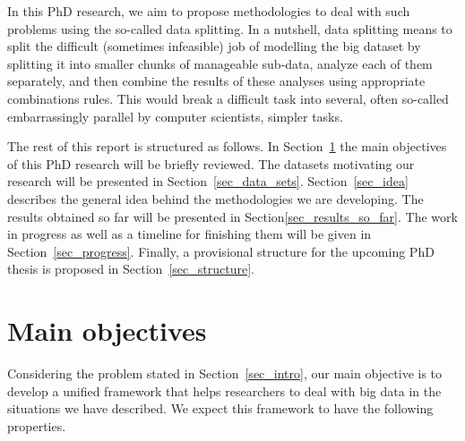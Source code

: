 \documentclass[14pt]{article}
\begin{document}
In this PhD research, we aim to propose methodologies to deal with such problems using the so-called data splitting. In a nutshell, data splitting means to split the difficult (sometimes infeasible) job of modelling the big dataset by splitting it into smaller chunks of manageable sub-data, analyze each of them separately, and then combine the results of these analyses using appropriate combinations rules. This would break a difficult task into several, often so-called embarrassingly parallel by computer scientists, simpler tasks.

The rest of this report is structured as follows. In Section~\ref{sec_objective} the main objectives of this PhD research will be briefly reviewed. The datasets motivating our research will be presented in Section~\ref{sec_data_sets}. Section~\ref{sec_idea} describes the general idea behind the methodologies we are developing. The results obtained so far will be presented in Section\ref{sec_results_so_far}. The work in progress as well as a timeline for finishing them will be given in Section~\ref{sec_progress}. Finally, a provisional structure for the upcoming PhD thesis is proposed in Section~\ref{sec_structure}. 

\section{Main objectives}
\label{sec_objective}
Considering the problem stated in Section~\ref{sec_intro}, our main objective is to develop a unified framework that helps researchers to deal with big data in the situations we have described. We expect this framework to have the following properties.
\end{document}
